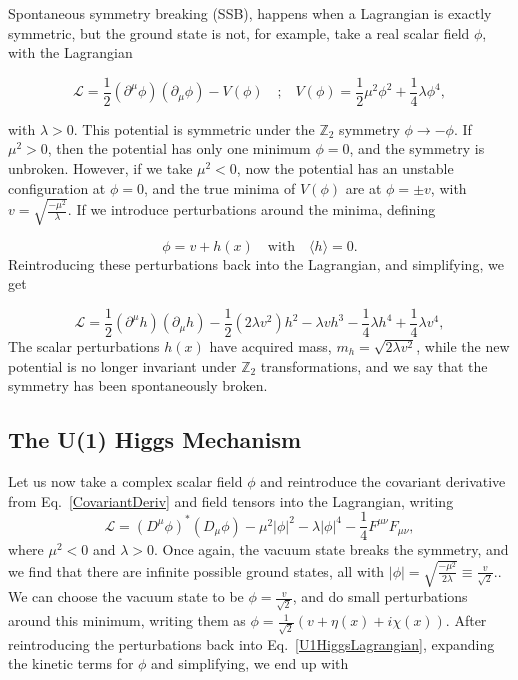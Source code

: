 \documentclass[EPJ,twocolumn]{webofc}
\begin{document}
Spontaneous symmetry breaking (SSB), happens when a Lagrangian is exactly symmetric, but the ground state is not, for example, take a real scalar field $\phi$, with the Lagrangian

\begin{equation}
    \mathcal{L} = \frac{1}{2}\left(\partial^{\mu}\phi\right)\left(\partial_{\mu}\phi\right)-V(\phi) \quad\text{;}\quad  V(\phi)=\frac{1}{2}\mu^2\phi^2+\frac{1}{4}\lambda\phi^4,
\end{equation}
    

with $\lambda > 0$. This potential is symmetric under the $\mathbb{Z}_2$ symmetry $\phi \to -\phi$. If $\mu^2 > 0$, then the potential has only one minimum $\phi = 0$, and the symmetry is unbroken. However, if we take $\mu^2 < 0$, now the potential has an unstable configuration at $\phi = 0$, and the true minima of  $V(\phi)$ are at $\phi = \pm v$, with $v = \sqrt{\frac{-\mu^2}{\lambda}}$. If we introduce perturbations around the minima, defining

\begin{equation}
    \phi = v + h(x) 
    \quad\text{with}\quad 
    \langle h\rangle = 0.
\end{equation}
Reintroducing these perturbations back into the Lagrangian, and simplifying, we get

\begin{equation}
    \mathcal{L} = \frac{1}{2}\left(\partial^{\mu}h\right)\left(\partial_{\mu}h\right)-\frac{1}{2}\left(2\lambda v^2\right)h^2-\lambda v h^3-\frac{1}{4}\lambda h^4+\frac{1}{4}\lambda v^4,
\end{equation}
The scalar perturbations $h(x)$  have acquired mass, $m_h=\sqrt{2\lambda v^2}$, while the new potential is no longer invariant under $\mathbb{Z}_2$ transformations, and we say that the symmetry has been spontaneously broken.

\subsection*{The U(1) Higgs Mechanism}

Let us now take a complex scalar field $\phi$ and reintroduce the covariant derivative from Eq.~\eqref{CovariantDeriv} and field tensors into the Lagrangian, writing
\begin{equation}
    \mathcal{L} = \left( D^{\mu}\phi\right)^* \left( D_{\mu}\phi\right) -\mu^2|\phi|^2-\lambda|\phi|^4-\frac{1}{4}F^{\mu\nu}F_{\mu\nu},
    \label{U1HiggsLagrangian}
\end{equation}
where $\mu^2<0$ and $\lambda>0$. Once again, the vacuum state breaks the symmetry, and we find that there are infinite possible ground states, all with $|\phi|=\sqrt{\frac{-\mu^2}{2\lambda}}\equiv \frac{v}{\sqrt{2}}$.. We can choose the vacuum state to be $\phi = \frac{v}{\sqrt{2}}$, and do small perturbations around this minimum, writing them as $\phi = \frac{1}{\sqrt{2}}\left(v+\eta(x)+i\chi(x)\right)$.
After reintroducing the perturbations back into Eq.~\eqref{U1HiggsLagrangian}, expanding the kinetic terms for $\phi$ and simplifying, we end up with
\end{document}
